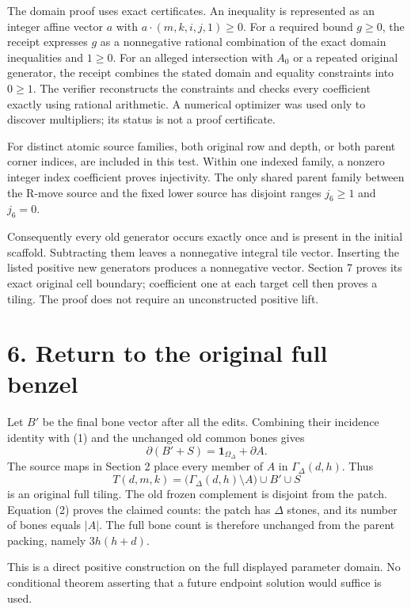 The domain proof uses exact certificates. An inequality is represented
as an integer affine vector \(a\) with \(a\cdot(m,k,i,j,1)\ge0\). For a
required bound \(g\ge0\), the receipt expresses \(g\) as a nonnegative
rational combination of the exact domain inequalities and \(1\ge0\). For
an alleged intersection with \(A_0\) or a repeated original generator,
the receipt combines the stated domain and equality constraints into
\(0\ge1\). The verifier reconstructs the constraints and checks every
coefficient exactly using rational arithmetic. A numerical optimizer was
used only to discover multipliers; its status is not a proof
certificate.

For distinct atomic source families, both original row and depth, or
both parent corner indices, are included in this test. Within one
indexed family, a nonzero integer index coefficient proves injectivity.
The only shared parent family between the R-move source and the fixed
lower source has disjoint ranges \(j_6\ge1\) and \(j_6=0\).

Consequently every old generator occurs exactly once and is present in
the initial scaffold. Subtracting them leaves a nonnegative integral
tile vector. Inserting the listed positive new generators produces a
nonnegative vector. Section 7 proves its exact original cell boundary;
coefficient one at each target cell then proves a tiling. The proof does
not require an unconstructed positive lift.

\section{6. Return to the original full
benzel}\label{return-to-the-original-full-benzel}

Let \(B'\) be the final bone vector after all the edits. Combining their
incidence identity with (1) and the unchanged old common bones gives \[
\partial(B'+S)=\mathbf1_{\Omega_\Delta}+\partial A.\tag{2}
\] The source maps in Section 2 place every member of \(A\) in
\(\Gamma_\Delta(d,h)\). Thus \[
T(d,m,k)=\bigl(\Gamma_\Delta(d,h)\setminus A\bigr)\cup B'\cup S
\] is an original full tiling. The old frozen complement is disjoint
from the patch. Equation (2) proves the claimed counts: the patch has
\(\Delta\) stones, and its number of bones equals \(|A|\). The full bone
count is therefore unchanged from the parent packing, namely
\(3h(h+d)\).

This is a direct positive construction on the full displayed parameter
domain. No conditional theorem asserting that a future endpoint solution
would suffice is used.

